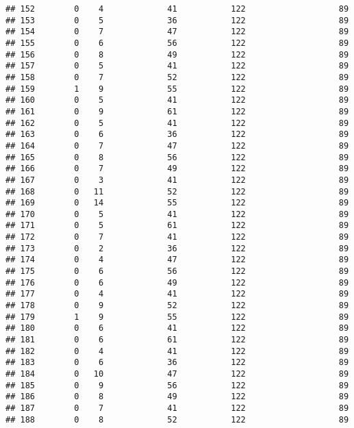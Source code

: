\documentclass[]{article}
\begin{document}
\begin{verbatim}
## 152        0    4             41           122                   89
## 153        0    5             36           122                   89
## 154        0    7             47           122                   89
## 155        0    6             56           122                   89
## 156        0    8             49           122                   89
## 157        0    5             41           122                   89
## 158        0    7             52           122                   89
## 159        1    9             55           122                   89
## 160        0    5             41           122                   89
## 161        0    9             61           122                   89
## 162        0    5             41           122                   89
## 163        0    6             36           122                   89
## 164        0    7             47           122                   89
## 165        0    8             56           122                   89
## 166        0    7             49           122                   89
## 167        0    3             41           122                   89
## 168        0   11             52           122                   89
## 169        0   14             55           122                   89
## 170        0    5             41           122                   89
## 171        0    5             61           122                   89
## 172        0    7             41           122                   89
## 173        0    2             36           122                   89
## 174        0    4             47           122                   89
## 175        0    6             56           122                   89
## 176        0    6             49           122                   89
## 177        0    4             41           122                   89
## 178        0    9             52           122                   89
## 179        1    9             55           122                   89
## 180        0    6             41           122                   89
## 181        0    6             61           122                   89
## 182        0    4             41           122                   89
## 183        0    6             36           122                   89
## 184        0   10             47           122                   89
## 185        0    9             56           122                   89
## 186        0    8             49           122                   89
## 187        0    7             41           122                   89
## 188        0    8             52           122                   89

\end{verbatim}
\end{document}
